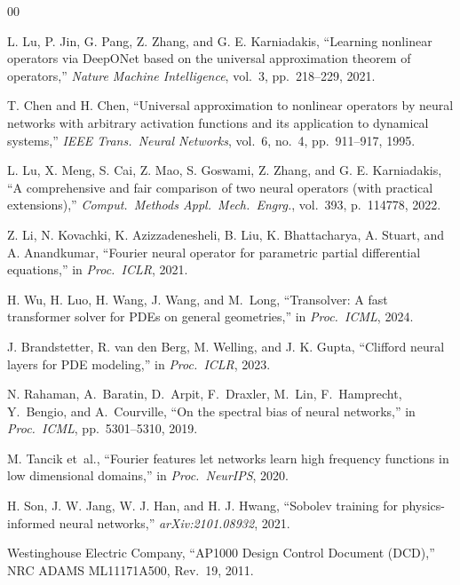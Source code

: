 \documentclass[journal]{IEEEtran}
\newcommand{\added}[1]{#1}
\begin{document}
\begin{thebibliography}{00}

L. Lu, P. Jin, G. Pang, Z. Zhang, and G. E. Karniadakis,
``Learning nonlinear operators via DeepONet based on the universal approximation theorem of operators,''
\textit{Nature Machine Intelligence}, vol.~3, pp.~218--229, 2021.

T. Chen and H. Chen,
``Universal approximation to nonlinear operators by neural networks with arbitrary activation functions and its application to dynamical systems,''
\textit{IEEE Trans.\ Neural Networks}, vol.~6, no.~4, pp.~911--917, 1995.

\added{L. Lu, X. Meng, S. Cai, Z. Mao, S. Goswami, Z. Zhang, and G. E. Karniadakis,
``A comprehensive and fair comparison of two neural operators (with practical extensions),''
\textit{Comput.\ Methods Appl.\ Mech.\ Engrg.}, vol.~393, p.~114778, 2022.}

Z. Li, N. Kovachki, K. Azizzadenesheli, B. Liu, K. Bhattacharya, A. Stuart, and A. Anandkumar,
``Fourier neural operator for parametric partial differential equations,''
in \textit{Proc.\ ICLR}, 2021.

H. Wu, H. Luo, H. Wang, J. Wang, and M.~Long,
``Transolver: A fast transformer solver for PDEs on general geometries,''
in \textit{Proc.\ ICML}, 2024.

\added{J. Brandstetter, R. van den Berg, M. Welling, and J. K. Gupta,
``Clifford neural layers for PDE modeling,''
in \textit{Proc.\ ICLR}, 2023.}

N. Rahaman, A.~Baratin, D.~Arpit, F.~Draxler, M.~Lin, F.~Hamprecht, Y.~Bengio, and A.~Courville,
``On the spectral bias of neural networks,''
in \textit{Proc.\ ICML}, pp.~5301--5310, 2019.

M. Tancik et~al.,
``Fourier features let networks learn high frequency functions in low dimensional domains,''
in \textit{Proc.\ NeurIPS}, 2020.

H. Son, J. W. Jang, W. J. Han, and H. J. Hwang,
``Sobolev training for physics-informed neural networks,''
\textit{arXiv:2101.08932}, 2021.

Westinghouse Electric Company,
``AP1000 Design Control Document (DCD),''
NRC ADAMS ML11171A500, Rev.~19, 2011.


\end{thebibliography}
\end{document}
